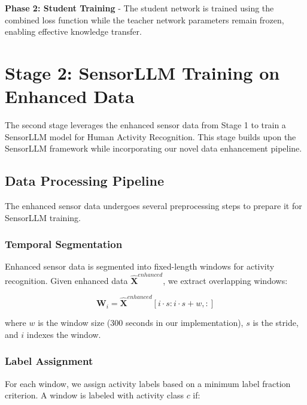 \textbf{Phase 2: Student Training} - The student network is trained using the combined loss function while the teacher network parameters remain frozen, enabling effective knowledge transfer.

\section{Stage 2: SensorLLM Training on Enhanced Data}

\hspace{2em}The second stage leverages the enhanced sensor data from Stage 1 to train a SensorLLM model for Human Activity Recognition. This stage builds upon the SensorLLM framework \cite{li2024sensorllm} while incorporating our novel data enhancement pipeline.

\subsection{Data Processing Pipeline}

\hspace{2em}The enhanced sensor data undergoes several preprocessing steps to prepare it for SensorLLM training.

\subsubsection{Temporal Segmentation}

\hspace{2em}Enhanced sensor data is segmented into fixed-length windows for activity recognition. Given enhanced data $\hat{\mathbf{X}}^{enhanced}$, we extract overlapping windows:

\begin{equation}
\mathbf{W}_i = \hat{\mathbf{X}}^{enhanced}[i \cdot s : i \cdot s + w, :]
\end{equation}

where $w$ is the window size (300 seconds in our implementation), $s$ is the stride, and $i$ indexes the window.

\subsubsection{Label Assignment}

\hspace{2em}For each window, we assign activity labels based on a minimum label fraction criterion. A window is labeled with activity class $c$ if:


